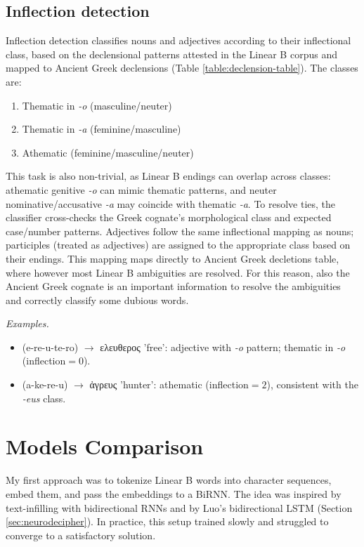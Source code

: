 \subsection{Inflection detection}
Inflection detection classifies nouns and adjectives according to their inflectional class, based on the declensional patterns attested in the Linear B corpus and mapped to Ancient Greek declensions (Table \ref{table:declension-table}). The classes are:
\begin{enumerate}[start=0]
    \item Thematic in \textit{-o} (masculine/neuter)
    \item Thematic in \textit{-a} (feminine/masculine)
    \item Athematic (feminine/masculine/neuter)
\end{enumerate}
This task is also non-trivial, as Linear B endings can overlap across classes: athematic genitive \textit{-o} can mimic thematic patterns, and neuter nominative/accusative \textit{-a} may coincide with thematic \textit{-a}.
To resolve ties, the classifier cross-checks the Greek cognate's morphological class and expected case/number patterns. Adjectives follow the same inflectional mapping as nouns; participles (treated as adjectives) are assigned to the appropriate class based on their endings.
This mapping maps directly to Ancient Greek decletions table, where however most Linear B ambiguities are resolved.
For this reason, also the Ancient Greek cognate is an important information to resolve the ambiguities and correctly classify some dubious words.

\textit{Examples.}
\begin{itemize}
  \item \textlinb{\Be\Bre\Bu\Bte\Bro}(e-re-u-te-ro) $\rightarrow$ \textgreek{ελευθερος} 'free': adjective with \textit{-o} pattern;  thematic in \textit{-o} (inflection$=0$).
  \item \textlinb{\Ba\Bke\Bre\Bu}(a-ke-re-u) $\rightarrow$ \textgreek{ἀγρευς} 'hunter': athematic (inflection$=2$), consistent with the \textit{-eus} class.
\end{itemize}

\section{Models Comparison}
My first approach was to tokenize Linear B words into character sequences, embed them, and pass the embeddings to a BiRNN. The idea was inspired by text-infilling with bidirectional RNNs \cite{brnn-paper} and by Luo's bidirectional LSTM (Section \ref{sec:neurodecipher}).
In practice, this setup trained slowly and struggled to converge to a satisfactory solution.

